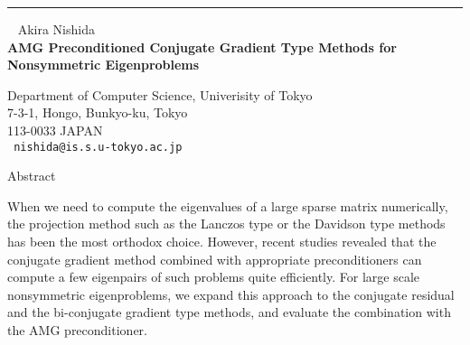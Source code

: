 \documentclass{report}
\begin{document}
\begin{center}

\rule{6in}{1pt} \
{\large
Akira Nishida
\\ {\bf
AMG Preconditioned Conjugate Gradient Type Methods
for Nonsymmetric Eigenproblems 
}}

Department of Computer Science, Univerisity of Tokyo \\
7-3-1, Hongo, Bunkyo-ku, Tokyo \\
113-0033 JAPAN
\\ {\tt
nishida@is.s.u-tokyo.ac.jp
}
\end{center}


Abstract

When we need to compute the eigenvalues of a large sparse matrix
numerically, the projection method such as the Lanczos type or the
Davidson type methods has been the most orthodox choice. However,
recent studies revealed that the conjugate gradient method combined
with appropriate preconditioners can compute a few eigenpairs of such
problems quite efficiently. For large scale nonsymmetric eigenproblems,
we expand this approach to the conjugate residual and the bi-conjugate
gradient type methods, and evaluate the combination with the AMG
preconditioner.
\end{document}
